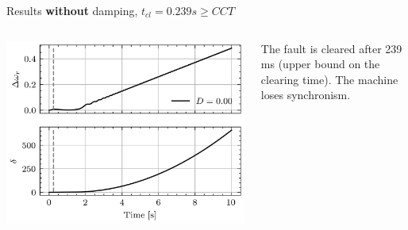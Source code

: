 \begin{frame} {Results \textbf{without} damping, $t_{cl} = 0.239 s \geq CCT$}
    \begin{columns}
    \begin{column}{0.55\textwidth}
        \begin{center}
        \includegraphics[width=0.9\linewidth]{images/P-dynamics_failed.png}
        \end{center}
    \end{column}
    \begin{column}{0.45\textwidth}
        The fault is cleared after 239 ms (upper bound on the clearing time). The machine loses synchronism.
    \end{column}
\end{columns}

\end{frame}

